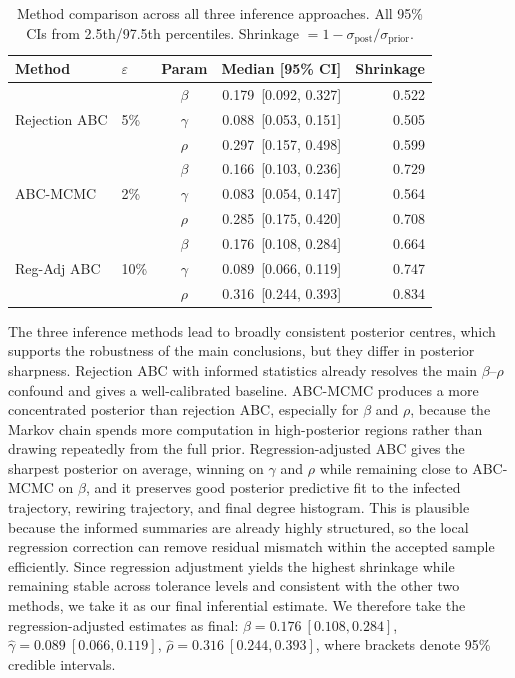 \documentclass[12pt]{article}
\begin{document}
\begin{table}[h]
\centering
\small
\begin{tabular}{llcrr}
\toprule
\textbf{Method} & \textbf{$\varepsilon$} & \textbf{Param} & \textbf{Median [95\% CI]} & \textbf{Shrinkage} \\
\midrule
\multirow{3}{*}{Rejection ABC}
  & \multirow{3}{*}{5\%}
  & $\beta$  & 0.179\ [0.092, 0.327] & 0.522 \\
  & & $\gamma$ & 0.088\ [0.053, 0.151] & 0.505 \\
  & & $\rho$   & 0.297\ [0.157, 0.498] & 0.599 \\
\midrule
\multirow{3}{*}{ABC-MCMC}
  & \multirow{3}{*}{2\%}
  & $\beta$  & 0.166\ [0.103, 0.236] & 0.729 \\
  & & $\gamma$ & 0.083\ [0.054, 0.147] & 0.564 \\
  & & $\rho$   & 0.285\ [0.175, 0.420] & 0.708 \\
\midrule
\multirow{3}{*}{Reg-Adj ABC}
  & \multirow{3}{*}{10\%}
  & $\beta$  & 0.176\ [0.108, 0.284] & 0.664 \\
  & & $\gamma$ & 0.089\ [0.066, 0.119] & 0.747 \\
  & & $\rho$   & 0.316\ [0.244, 0.393] & 0.834 \\
\bottomrule
\end{tabular}
\caption{Method comparison across all three inference approaches. All 95\% CIs from 2.5th/97.5th percentiles. Shrinkage $= 1 - \sigma_{\mathrm{post}}/\sigma_{\mathrm{prior}}$.}
\label{tab:comparison}
\end{table}

The three inference methods lead to broadly consistent posterior centres, which supports the robustness of the main conclusions, but they differ in posterior sharpness. Rejection ABC with informed statistics already resolves the main $\beta$--$\rho$ confound and gives a well-calibrated baseline. ABC-MCMC produces a more concentrated posterior than rejection ABC, especially for $\beta$ and $\rho$, because the Markov chain spends more computation in high-posterior regions rather than drawing repeatedly from the full prior. Regression-adjusted ABC gives the sharpest posterior on average, winning on $\gamma$ and $\rho$ while remaining close to ABC-MCMC on $\beta$, and it preserves good posterior predictive fit to the infected trajectory, rewiring trajectory, and final degree histogram. This is plausible because the informed summaries are already highly structured, so the local regression correction can remove residual mismatch within the accepted sample efficiently. Since regression adjustment yields the highest shrinkage while remaining stable across tolerance levels and consistent with the other two methods, we take it as our final inferential estimate. We therefore take the regression-adjusted estimates as final: $\hat\beta = 0.176\ [0.108, 0.284]$, $\hat\gamma = 0.089\ [0.066, 0.119]$, $\hat\rho = 0.316\ [0.244, 0.393]$, where brackets denote 95\% credible intervals.
\end{document}
